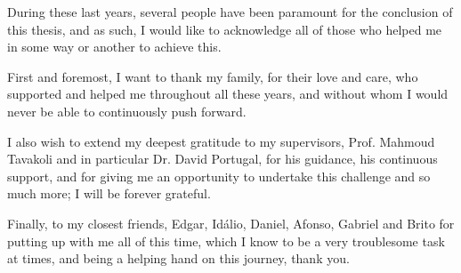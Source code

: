 \vspace{1cm}
\noindent

During these last years, several people have been paramount for the conclusion of this thesis, and as such, I would like to acknowledge all of those who helped me in some way or another to achieve this.

First and foremost, I want to thank my family, for their love and care, who supported and helped me throughout all these years, and without whom I would never be able to continuously push forward. 

I also wish to extend my deepest gratitude to my supervisors, Prof. Mahmoud Tavakoli and in particular Dr. David Portugal, for his guidance, his continuous support, and for giving me an opportunity to undertake this challenge and so much more; I will be forever grateful.

Finally, to my closest friends, Edgar, Idálio, Daniel, Afonso, Gabriel and Brito for putting up with me all of this time, which I know to be a very troublesome task at times, and being a helping hand on this journey, thank you.